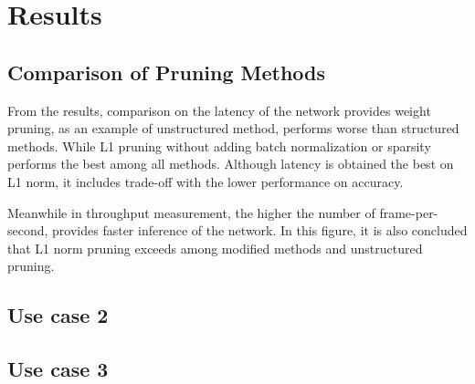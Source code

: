 

    \chapter{Results}

    \section{Comparison of Pruning Methods}

    From the results, comparison on the latency of the network provides weight pruning, as an example of unstructured method, performs worse than structured methods. While L1 pruning without adding batch normalization or sparsity performs the best among all methods. Although latency is obtained the best on L1 norm, it includes trade-off with the lower performance on accuracy.
    
    Meanwhile in throughput measurement, the higher the number of frame-per-second, provides faster inference of the network. In this figure, it is also concluded that L1 norm pruning exceeds among modified methods and unstructured pruning.
    

    \section{Use case 2}

    \section{Use case 3}

